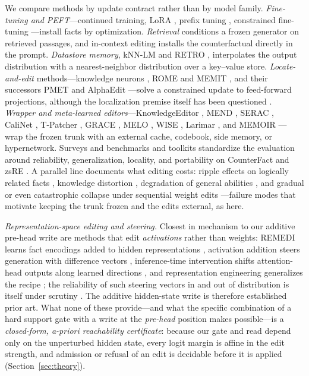 \documentclass[11pt]{article}
\theoremstyle{remark}
\begin{document}
We compare methods by update contract rather than by model family.
\emph{Fine-tuning and PEFT}---continued training, LoRA \citep{hu2021lora}, prefix
tuning \citep{li2021prefix}, constrained fine-tuning \citep{zhu2020modifying}---install
facts by optimization. \emph{Retrieval} \citep{lewis2020rag} conditions a frozen
generator on retrieved passages, and in-context editing \citep{zheng2023ike}
installs the counterfactual directly in the prompt. \emph{Datastore memory},
kNN-LM and RETRO
\citep{khandelwal2019knnlm, borgeaud2021retro}, interpolates the output
distribution with a nearest-neighbor distribution over a key--value store.
\emph{Locate-and-edit} methods---knowledge neurons \citep{dai2022neurons}, ROME
and MEMIT \citep{meng2022rome, meng2022memit}, and their successors PMET
\citep{li2024pmet} and AlphaEdit \citep{fang2025alphaedit}---solve a constrained
update to feed-forward projections, although the localization premise itself has
been questioned \citep{hase2023localization}.
\emph{Wrapper and meta-learned editors}---KnowledgeEditor \citep{decao2021editing},
MEND \citep{mitchell2021mend}, SERAC \citep{mitchell2022serac}, CaliNet
\citep{dong2022calinet}, T-Patcher \citep{huang2023tpatcher}, GRACE
\citep{hartvigsen2023grace}, MELO \citep{yu2024melo}, WISE \citep{wang2024wise},
Larimar \citep{das2024larimar}, and MEMOIR \citep{wang2025memoir}---wrap the
frozen trunk with an external cache, codebook, side memory, or hypernetwork.
Surveys and benchmarks \citep{yao2023editing, zhang2024knowedit} and toolkits
\citep{wang2023easyedit} standardize the evaluation around reliability,
generalization, locality, and portability \citep{zhong2023mquake} on CounterFact
\citep{meng2022rome} and zsRE \citep{levy2017zeroshot}. A parallel line documents
what editing costs: ripple effects on logically related facts
\citep{cohen2024ripple}, knowledge distortion \citep{li2024pitfalls}, degradation
of general abilities \citep{gu2024harms}, and gradual or even catastrophic
collapse under sequential weight edits \citep{gupta2024forgetting,
yang2024butterfly}---failure modes that motivate keeping the trunk frozen and the
edits external, as here.

\emph{Representation-space editing and steering.} Closest in mechanism to our
additive pre-head write are methods that edit \emph{activations} rather than
weights: REMEDI learns fact encodings added to hidden representations
\citep{hernandez2024remedi}, activation addition steers generation with
difference vectors \citep{turner2023actadd}, inference-time intervention shifts
attention-head outputs along learned directions \citep{li2023iti}, and
representation engineering generalizes the recipe \citep{zou2023repe}; the
reliability of such steering vectors in and out of distribution is itself under
scrutiny \citep{tan2024steering}. The additive hidden-state write is therefore
established prior art. What none of these provide---and what the specific
combination of a hard support gate with a write at the \emph{pre-head} position
makes possible---is a \emph{closed-form, a-priori reachability certificate}:
because our gate and read depend only on the unperturbed hidden state, every
logit margin is affine in the edit strength, and admission or refusal of an edit
is decidable before it is applied (Section~\ref{sec:theory}).
\end{document}
